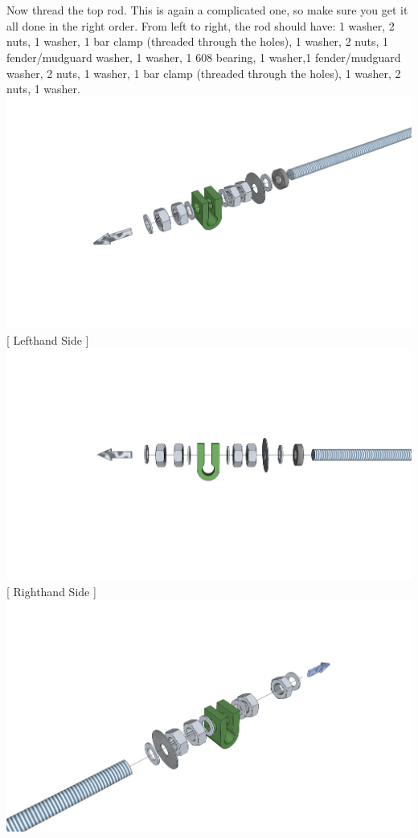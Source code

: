 \documentclass[twoside,openany,a4paper,titlepage]{memoir}
\begin{document}
	\section{}
	Now thread the top rod. This is again a complicated one, so make sure you get it all done in the right
	order. From left to right, the rod should have: 1 washer, 2 nuts, 1 washer, 1 bar clamp (threaded
	through the holes), 1 washer, 2 nuts, 1 fender/mudguard washer, 1 washer, 1 608 bearing, 1 washer,1
	fender/mudguard washer, 2 nuts, 1 washer, 1 bar clamp (threaded through the holes), 1 washer, 2 nuts,
	1 washer.\\
	\includegraphics[width=1\linewidth]{graphics/ch3_2_1.png}
	[ Lefthand Side ]
	\includegraphics[width=1\linewidth]{graphics/ch3_2_2.png}
	[ Righthand Side ]
	\includegraphics[width=1\linewidth]{graphics/ch3_2_3.png}
	
\end{document}
